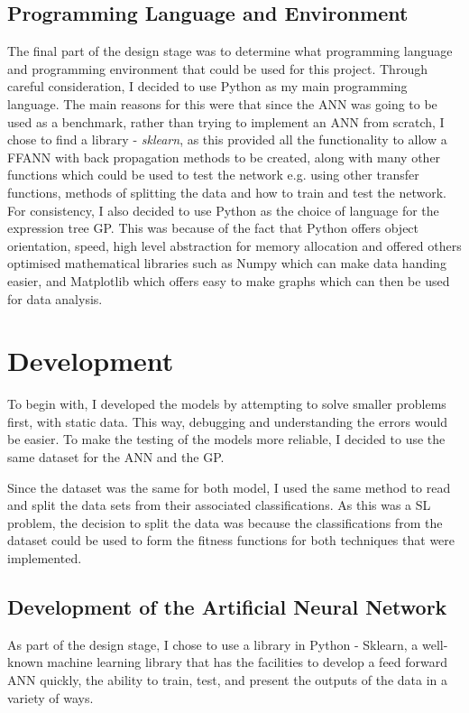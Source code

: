 \documentclass[11pt]{article}
\begin{document}
\subsection{Programming Language and Environment}
The final part of the design stage was to determine what programming language and programming environment that could be used for this project. Through careful consideration, I decided to use Python as my main programming language. The main reasons for this were that since the ANN was going to be used as a benchmark, rather than trying to implement an ANN from scratch, I chose to find a library - \textit{sklearn}, as this provided all the functionality to allow a FFANN with back propagation methods to be created, along with many other functions which could be used to test the network e.g. using other transfer functions, methods of splitting the data and how to train and test the network. For consistency, I also decided to use Python as the choice of language for the expression tree GP. This was because of the fact that Python offers object orientation, speed, high level abstraction for memory allocation and offered others optimised mathematical libraries such as Numpy which can make data handing easier, and Matplotlib which offers easy to make graphs which can then be used for data analysis. 
\section{Development}
To begin with, I developed the models by attempting to solve smaller problems first, with static data. This way, debugging and understanding the errors would be easier. To make the testing of the models more reliable, I decided to use the same dataset for the ANN and the GP. 

Since the dataset was the same for both model, I used the same method to read and split the data sets from their associated classifications. As this was a SL problem, the decision to split the data was because the classifications from the dataset could be used to form the fitness functions for both techniques that were implemented.
\subsection{Development of the Artificial Neural Network}
As part of the design stage, I chose to use a library in Python - Sklearn, a well-known machine learning library that has the facilities to develop a feed forward ANN quickly, the ability to train, test, and present the outputs of the data in a variety of ways. 
\end{document}
